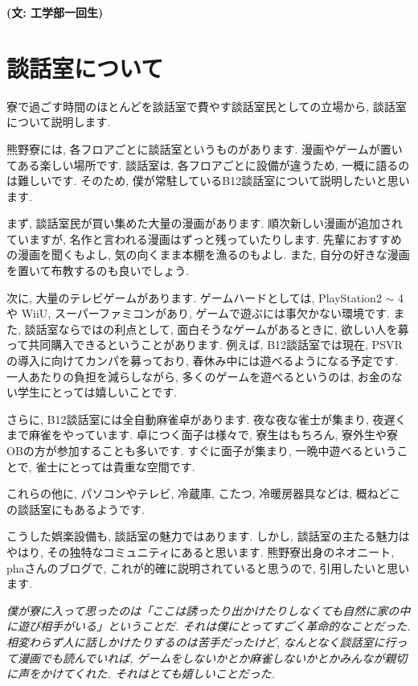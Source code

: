 \documentclass[10pt,b5jsbook,dvips,dvipdfmx,openany]{jsbook}
\theoremstyle{definition}
\begin{document}
{\bf (文: 工学部一回生)}

		\section{談話室について}

		寮で過ごす時間のほとんどを談話室で費やす談話室民としての立場から, 談話室について説明します.

		熊野寮には, 各フロアごとに談話室というものがあります. 漫画やゲームが置いてある楽しい場所です. 談話室は, 各フロアごとに設備が違うため, 一概に語るのは難しいです. そのため, 僕が常駐しているB12談話室について説明したいと思います.

		まず, 談話室民が買い集めた大量の漫画があります. 順次新しい漫画が追加されていますが, 名作と言われる漫画はずっと残っていたりします. 先輩におすすめの漫画を聞くもよし, 気の向くまま本棚を漁るのもよし. また, 自分の好きな漫画を置いて布教するのも良いでしょう.

		次に, 大量のテレビゲームがあります. ゲームハードとしては, PlayStation2 $ \sim $ 4や WiiU, スーパーファミコンがあり, ゲームで遊ぶには事欠かない環境です. また, 談話室ならではの利点として, 面白そうなゲームがあるときに, 欲しい人を募って共同購入できるということがあります. 例えば, B12談話室では現在, PSVRの導入に向けてカンパを募っており, 春休み中には遊べるようになる予定です. 一人あたりの負担を減らしながら, 多くのゲームを遊べるというのは, お金のない学生にとっては嬉しいことです.

		さらに, B12談話室には全自動麻雀卓があります. 夜な夜な雀士が集まり, 夜遅くまで麻雀をやっています. 卓につく面子は様々で, 寮生はもちろん, 寮外生や寮OBの方が参加することも多いです. すぐに面子が集まり, 一晩中遊べるということで, 雀士にとっては貴重な空間です.

		これらの他に, パソコンやテレビ, 冷蔵庫, こたつ, 冷暖房器具などは, 概ねどこの談話室にもあるようです.

		こうした娯楽設備も, 談話室の魅力ではあります. しかし, 談話室の主たる魅力はやはり, その独特なコミュニティにあると思います. 熊野寮出身のネオニート, phaさんのブログで, これが的確に説明されていると思うので, 引用したいと思います.

		\emph{僕が寮に入って思ったのは「ここは誘ったり出かけたりしなくても自然に家の中に遊び相手がいる」ということだ. それは僕にとってすごく革命的なことだった. 相変わらず人に話しかけたりするのは苦手だったけど, なんとなく談話室に行って漫画でも読んでいれば, ゲームをしないかとか麻雀しないかとかみんなが親切に声をかけてくれた. それはとても嬉しいことだった. }
\end{document}
